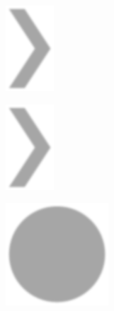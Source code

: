 \documentclass[12pt]{article}
\begin{document}
\begin{figure}[H]
\includegraphics[width=0.5\linewidth]{page49-image-11.png}
\end{figure}
\begin{figure}[H]
\includegraphics[width=0.5\linewidth]{page49-image-12.png}
\end{figure}
\begin{figure}[H]
\includegraphics[width=0.5\linewidth]{page49-image-13.png}
\end{figure}
\end{document}
